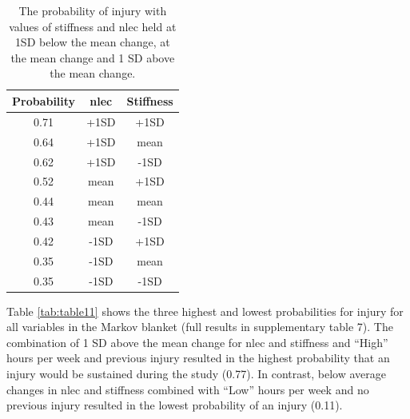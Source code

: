 \documentclass[
  english,
  man]{apa6}
\begin{document}
\begin{table}[H]

\caption{\label{tab:table10}The probability of injury with values of stiffness and nlec held at 1SD below the mean change, at the mean change and 1 SD above the mean change.}
\centering
\begin{tabular}[t]{c|c|c}
\hline
\textbf{Probability} & \textbf{nlec} & \textbf{Stiffness}\\
\hline
0.71 & +1SD & +1SD\\
\hline
0.64 & +1SD & mean\\
\hline
0.62 & +1SD & -1SD\\
\hline
0.52 & mean & +1SD\\
\hline
0.44 & mean & mean\\
\hline
0.43 & mean & -1SD\\
\hline
0.42 & -1SD & +1SD\\
\hline
0.35 & -1SD & mean\\
\hline
0.35 & -1SD & -1SD\\
\hline
\end{tabular}
\end{table}

Table \ref{tab:table11} shows the three highest and lowest probabilities for injury for all variables in the Markov blanket (full results in supplementary table 7).
The combination of 1 SD above the mean change for nlec and stiffness and ``High'' hours per week and previous injury resulted in the highest probability that an injury would be sustained during the study (0.77).
In contrast, below average changes in nlec and stiffness combined with ``Low'' hours per week and no previous injury resulted in the lowest probability of an injury (0.11).
\end{document}
